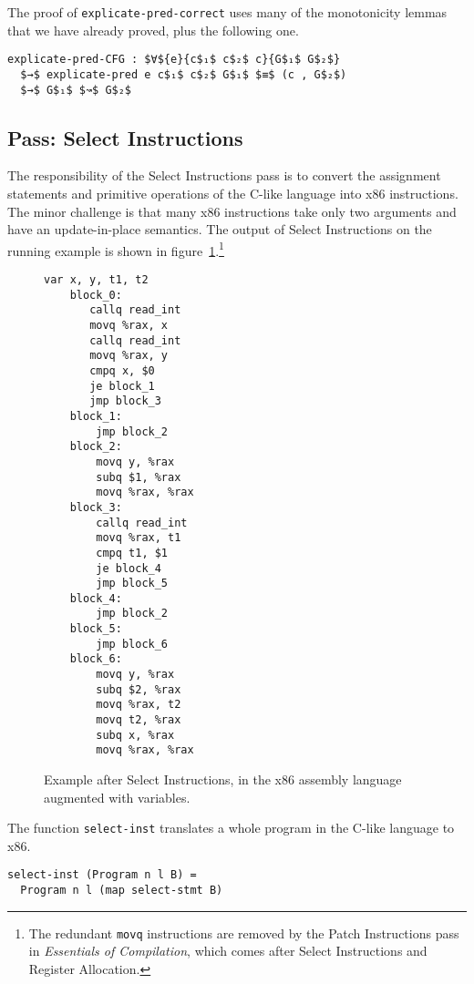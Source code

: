 \documentclass[sigplan,screen]{acmart}
\begin{document}
The proof of \lstinline{explicate-pred-correct} uses many of the
monotonicity lemmas that we have already proved, plus the following
one.

\begin{lstlisting}
explicate-pred-CFG : $∀${e}{c$₁$ c$₂$ c}{G$₁$ G$₂$}
  $→$ explicate-pred e c$₁$ c$₂$ G$₁$ $≡$ (c , G$₂$)
  $→$ G$₁$ $↝$ G$₂$
\end{lstlisting}

\subsection{Pass: Select Instructions}

The responsibility of the Select Instructions pass is to convert the
assignment statements and primitive operations of the C-like language
into x86 instructions. The minor challenge is that many x86
instructions take only two arguments and have an update-in-place
semantics. The output of Select Instructions on the running example is
shown in figure~\ref{fig:running-example-x86}.\footnote{The redundant
\texttt{movq} instructions are removed by the Patch Instructions pass
in \emph{Essentials of Compilation}, which comes after Select
Instructions and Register Allocation.}

\begin{figure}[tp]
\begin{lstlisting}[mathescape=false,basicstyle=\ttfamily\footnotesize]
    var x, y, t1, t2
    block_0:
       callq read_int
       movq %rax, x
       callq read_int
       movq %rax, y
       cmpq x, $0
       je block_1
       jmp block_3
    block_1:
        jmp block_2
    block_2:
        movq y, %rax
        subq $1, %rax
        movq %rax, %rax
    block_3:
        callq read_int
        movq %rax, t1
        cmpq t1, $1
        je block_4
        jmp block_5
    block_4:
        jmp block_2
    block_5:
        jmp block_6
    block_6:
        movq y, %rax
        subq $2, %rax
        movq %rax, t2
        movq t2, %rax
        subq x, %rax
        movq %rax, %rax
\end{lstlisting}
  \caption{Example after Select Instructions, in the x86 assembly language
    augmented with variables.}
\label{fig:running-example-x86}
\end{figure}

The function \lstinline{select-inst} translates a whole program in
the C-like language to x86.
\begin{lstlisting}
select-inst (Program n l B) =
  Program n l (map select-stmt B)
\end{lstlisting}
\end{document}
